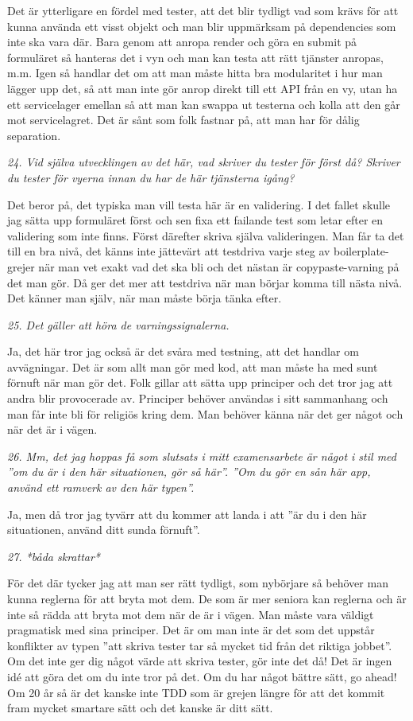 \documentclass[11pt]{article}
\begin{document}
Det är ytterligare en fördel med tester, att det blir tydligt vad som krävs för att kunna använda ett visst objekt och man blir uppmärksam på dependencies som inte ska vara där. Bara genom att anropa render och göra en submit på formuläret så hanteras det i vyn och man kan testa att rätt tjänster anropas, m.m. Igen så handlar det om att man måste hitta bra modularitet i hur man lägger upp det, så att man inte gör anrop direkt till ett API från en vy, utan ha ett servicelager emellan så att man kan swappa ut testerna och kolla att den går mot servicelagret. Det är sånt som folk fastnar på, att man har för dålig separation.

\emph{24. Vid själva utvecklingen av det här, vad skriver du tester för först då? Skriver du tester för vyerna innan du har de här tjänsterna igång?}

Det beror på, det typiska man vill testa här är en validering. I det fallet skulle jag sätta upp formuläret först och sen fixa ett failande test som letar efter en validering som inte finns. Först därefter skriva själva valideringen. Man får ta det till en bra nivå, det känns inte jättevärt att testdriva varje steg av boilerplate-grejer när man vet exakt vad det ska bli och det nästan är copypaste-varning på det man gör. Då ger det mer att testdriva när man börjar komma till nästa nivå. Det känner man själv, när man måste börja tänka efter.

\emph{25. Det gäller att höra de varningssignalerna.}

Ja, det här tror jag också är det svåra med testning, att det handlar om avvägningar. Det är som allt man gör med kod, att man måste ha med sunt förnuft när man gör det. Folk gillar att sätta upp principer och det tror jag att andra blir provocerade av. Principer behöver användas i sitt sammanhang och man får inte bli för religiös kring dem. Man behöver känna när det ger något och när det är i vägen.

\emph{26. Mm, det jag hoppas få som slutsats i mitt examensarbete är något i stil med ”om du är i den här situationen, gör så här”. ”Om du gör en sån här app, använd ett ramverk av den här typen”.}

Ja, men då tror jag tyvärr att du kommer att landa i att ”är du i den här situationen, använd ditt sunda förnuft”.

\emph{27. *båda skrattar*}

För det där tycker jag att man ser rätt tydligt, som nybörjare så behöver man kunna reglerna för att bryta mot dem. De som är mer seniora kan reglerna och är inte så rädda att bryta mot dem när de är i vägen. Man måste vara väldigt pragmatisk med sina principer. Det är om man inte är det som det uppstår konflikter av typen ”att skriva tester tar så mycket tid från det riktiga jobbet”. Om det inte ger dig något värde att skriva tester, gör inte det då! Det är ingen idé att göra det om du inte tror på det. Om du har något bättre sätt, go ahead! Om 20 år så är det kanske inte TDD som är grejen längre för att det kommit fram mycket smartare sätt och det kanske är ditt sätt.
\end{document}
